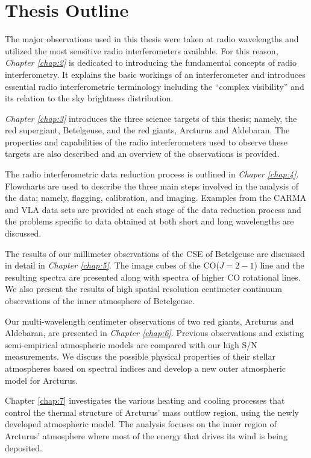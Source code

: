 \section{Thesis Outline}
The major observations used in this thesis were taken at radio wavelengths and utilized the most sensitive radio interferometers available. For this reason, \textit{Chapter \ref{chap:2}} is dedicated to introducing the fundamental concepts of radio interferometry. It explains the basic workings of an interferometer and introduces essential radio interferometric  terminology including the ``complex visibility'' and its relation to the sky brightness distribution.

\textit{Chapter \ref{chap:3}} introduces the three science targets of this thesis; namely, the red supergiant, Betelgeuse, and the red giants, Arcturus and Aldebaran. The properties and capabilities of the radio interferometers used to observe these targets are also described and an overview of the observations is provided.

The radio interferometric data reduction process is outlined in \textit{Chaper \ref{chap:4}}. Flowcharts are used to describe the three main steps involved in the analysis of the data; namely, flagging, calibration, and imaging. Examples from the CARMA and VLA data sets are provided at each stage of the data reduction process and the problems specific to data obtained at both short and long wavelengths are discussed. 

The results of our millimeter observations of the CSE of Betelgeuse are discussed in detail in \textit{Chapter \ref{chap:5}}. The image cubes of the CO($J=2-1$) line and the resulting spectra are presented along with spectra of higher CO rotational lines. We also present the results of high spatial resolution centimeter continuum observations of the inner atmosphere of Betelgeuse.

Our multi-wavelength centimeter observations of two red giants, Arcturus and Aldebaran, are presented in \textit{Chapter \ref{chap:6}}. Previous observations and existing semi-empirical atmospheric models are compared with our high S/N measurements. We discuss the possible physical properties of their stellar atmospheres based on spectral indices and develop a new outer atmospheric model for Arcturus.

Chapter \ref{chap:7} investigates the various heating and cooling processes that control the thermal structure of Arcturus' mass outflow region, using the newly developed atmospheric model. The analysis focuses on the inner region of Arcturus' atmosphere where most of the energy that drives its wind is being deposited. 

